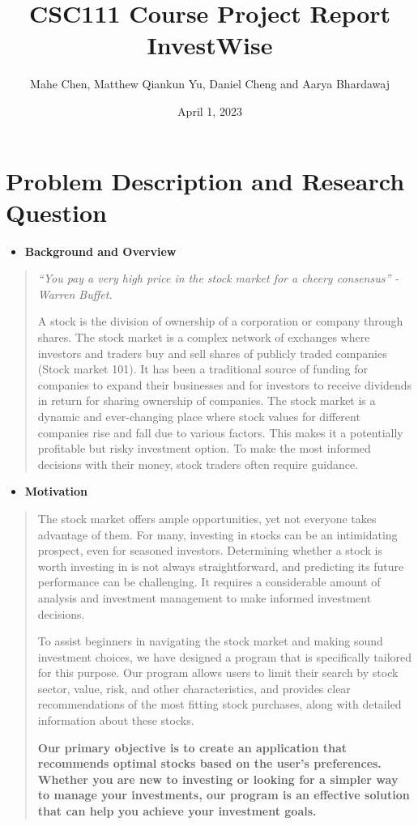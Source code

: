 \documentclass[fontsize=12pt]{article}
\title{%
  CSC111 Course Project Report \\
  \large InvestWise}
\author{Mahe Chen, Matthew Qiankun Yu, Daniel Cheng and Aarya Bhardawaj}
\date{April 1, 2023}
\begin{document}
\maketitle

\section*{Problem Description and Research Question}

\begin{itemize}
\item

\textbf{Background and Overview}

\end{itemize}

\begin{quote}
\noindent \textit{“You pay a very high price in the stock market for a cheery consensus” - Warren Buffet.}

A stock is the division of ownership of a corporation or company through shares. The stock market is a complex network of exchanges where investors and traders buy and sell shares of publicly traded companies (Stock market 101). It has been a traditional source of funding for companies to expand their businesses and for investors to receive dividends in return for sharing ownership of companies. The stock market is a dynamic and ever-changing place where stock values for different companies rise and fall due to various factors. This makes it a potentially profitable but risky investment option. To make the most informed decisions with their money, stock traders often require guidance.
\end{quote}

\begin{itemize}
\item
  
  \textbf{Motivation}
 
\end{itemize}

\begin{quote}
\noindent The stock market offers ample opportunities, yet not everyone takes advantage of them. For many, investing in stocks can be an intimidating prospect, even for seasoned investors. Determining whether a stock is worth investing in is not always straightforward, and predicting its future performance can be challenging. It requires a considerable amount of analysis and investment management to make informed investment decisions.

To assist beginners in navigating the stock market and making sound investment choices, we have designed a program that is specifically tailored for this purpose. Our program allows users to limit their search by stock sector, value, risk, and other characteristics, and provides clear recommendations of the most fitting stock purchases, along with detailed information about these stocks.  

\textbf{Our primary objective is to create an application that recommends optimal stocks based on the user's preferences. Whether you are new to investing or looking for a simpler way to manage your investments, our program is an effective solution that can help you achieve your investment goals.}
\end{quote}
\end{document}
